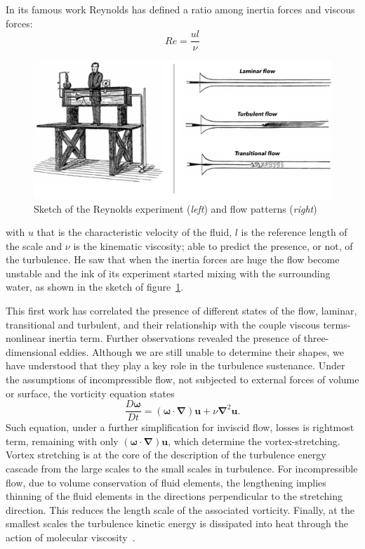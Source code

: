 \par
In its famous work Reynolds has defined a ratio among inertia forces and viscous forces:
\begin{equation}
Re = \frac{ul}{\nu}
\end{equation}
\begin{figure}
\begin{center}
\includegraphics[width=1\textwidth]{grafici/reynolds_exp}
\caption{Sketch of the Reynolds experiment (\emph{left}) and flow patterns (\emph{right})}
\label{Reynolds:exp}
\end{center}
\end{figure}

with $u$ that is the characteristic velocity of the fluid, $l$ is the reference length of the scale and $\nu$ is the kinematic viscosity; able to predict the presence, or not, of the turbulence. He saw that when the inertia forces are huge the flow become unstable and the ink of its experiment started mixing with the surrounding water, as shown in the sketch of figure~\ref{Reynolds:exp}.
\par
This first work has correlated the presence of different states of the flow, laminar, transitional and turbulent, and their relationship with the couple viscous terms-nonlinear inertia term.
Further observations revealed the presence of three-dimensional eddies. Although we are still unable to determine their shapes, we have understood that they play a key role in the turbulence sustenance. Under the assumptions of incompressible flow, not subjected to external forces of volume or surface, the vorticity equation states
\begin{equation}
\frac{D \boldsymbol{\omega}}{D t} = (\boldsymbol{\omega} \cdot \boldsymbol{\nabla})\boldsymbol{u} + \nu \boldsymbol{\nabla}^{2} \boldsymbol{u}.
\end{equation}
Such equation, under a further simplification for inviscid flow, losses is rightmost term, remaining with only $ (\boldsymbol{\omega} \cdot \boldsymbol{\nabla})\boldsymbol{u}$, which determine the vortex-stretching. 
Vortex stretching is at the core of the description of the turbulence energy cascade from the large scales to the small scales in turbulence.
For incompressible flow, due to volume conservation of fluid elements, the lengthening implies thinning of the fluid elements in the directions perpendicular to the stretching direction. This reduces the length scale of the associated vorticity. Finally, at the smallest scales the turbulence kinetic energy is dissipated into heat through the action of molecular viscosity~\cite{Lumley}.



